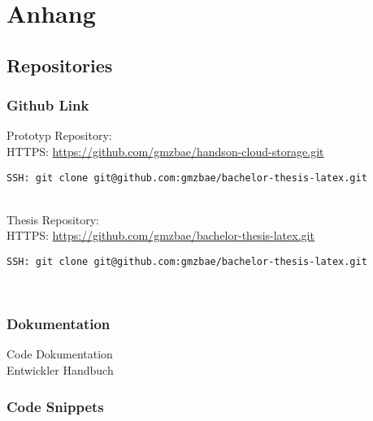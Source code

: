
\chapter{Anhang}

\section{Repositories}
\subsection{Github Link}

\large{Prototyp Repository:}\\

HTTPS: \url{https://github.com/gmzbae/handson-cloud-storage.git}

\begin{verbatim}SSH: git clone git@github.com:gmzbae/bachelor-thesis-latex.git\end{verbatim}\\				

\large{Thesis Repository:}\\

HTTPS: \url{https://github.com/gmzbae/bachelor-thesis-latex.git}

\begin{verbatim}SSH: git clone git@github.com:gmzbae/bachelor-thesis-latex.git \end{verbatim}\\

\subsection{Dokumentation}

Code Dokumentation\\
Entwickler Handbuch

\subsection{Code Snippets}

\clearpage